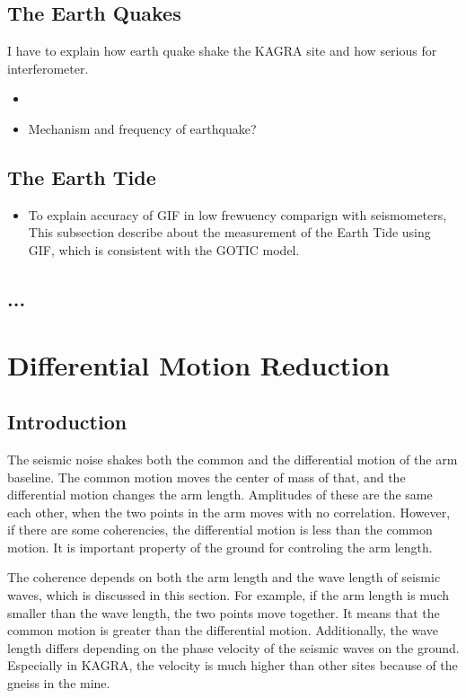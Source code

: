 \documentclass[a4paper,12pt]{book}
\begin{document}
\subsection{The Earth Quakes}
I have to explain how earth quake shake the KAGRA site and how serious for interferometer.
\begin{itemize}
\item 
\item Mechanism and frequency of earthquake?
\end{itemize}

\subsection{The Earth Tide}

\begin{itemize}
  \item To explain accuracy of GIF in low frewuency comparign with seismometers, This subsection describe about the measurement of the Earth Tide using GIF, which is consistent with the GOTIC model.
\end{itemize}

\subsection{...}
\section{Differential Motion Reduction}
\subsection{Introduction}
The seismic noise shakes both the common and the differential motion of the arm baseline. The common motion moves the center of mass of that, and the differential motion changes the arm length. Amplitudes of these are the same each other, when the two points in the arm moves with no correlation. However, if there are some coherencies, the differential motion is less than the common motion. It is important property of the ground for controling the arm length.

The coherence depends on both the arm length and the wave length of seismic waves, which is discussed in this section. For example, if the arm length is much smaller than the wave length, the two points move together. It means that the common motion is greater than the differential motion. Additionally, the wave length differs depending on the phase velocity of the seismic waves on the ground. Especially in KAGRA, the velocity is much higher than other sites because of the gneiss in the mine.
\end{document}
